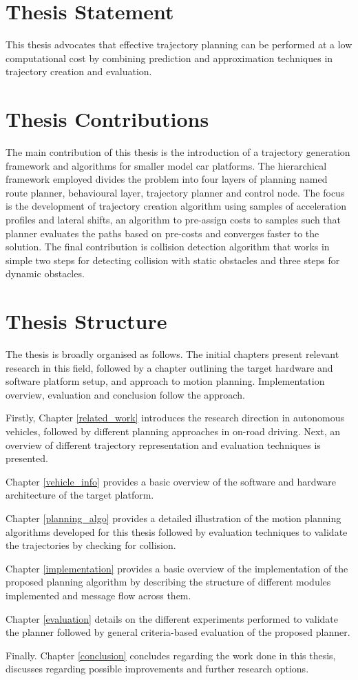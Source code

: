 \section{Thesis Statement}

This thesis advocates that effective trajectory planning can be performed at a low computational cost by combining prediction and approximation techniques in trajectory creation and evaluation.

\section{Thesis Contributions}

The main contribution of this thesis is the introduction of a trajectory generation framework and algorithms for smaller model car platforms. The hierarchical framework employed divides the problem into four layers of planning named route planner, behavioural layer, trajectory planner and control node. The focus is the development of trajectory creation algorithm using samples of acceleration profiles and lateral shifts, an algorithm to pre-assign costs to samples such that planner evaluates the paths based on pre-costs and converges faster to the solution. The final contribution is collision detection algorithm that works in simple two steps for detecting collision with static obstacles and three steps for dynamic obstacles. 

\section{Thesis Structure}


The thesis is broadly organised as follows. The initial chapters present relevant research in this field, followed by a chapter outlining the target hardware and software platform setup, and approach to motion planning. Implementation overview, evaluation and conclusion follow the approach.

Firstly, Chapter \ref{related_work} introduces the research direction in autonomous vehicles, followed by different planning approaches in on-road driving. Next, an overview of different trajectory representation and evaluation techniques is presented.

Chapter \ref{vehicle_info} provides a basic overview of the software and hardware architecture of the target platform.

Chapter \ref{planning_algo} provides a detailed illustration of the motion planning algorithms developed for this thesis followed by evaluation techniques to validate the trajectories by checking for collision.

Chapter \ref{implementation} provides a basic overview of the implementation of the proposed planning algorithm by describing the structure of different modules implemented and message flow across them.

Chapter \ref{evaluation} details on the different experiments performed to validate the planner followed by general criteria-based evaluation of the proposed planner.

Finally. Chapter \ref{conclusion} concludes regarding the work done in this thesis, discusses regarding possible improvements and further research options.
